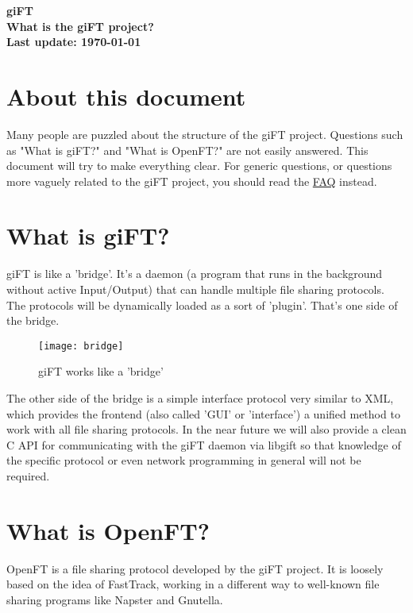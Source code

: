 \documentclass[10pt]{article}
\begin{document}
\begin{center}
\textsf{\textbf{\Huge{giFT}\\ \huge{What is the giFT project?}\\
\normalsize{Last update: \today}}}
\end{center}

\tableofcontents

\setlength{\parskip}{1.4ex}

\section{About this document}
Many people are puzzled about the structure of the giFT project. Questions
such as "What is giFT?" and "What is OpenFT?" are not easily answered. This
document will try to make everything clear. For generic questions, or questions
more vaguely related to the giFT project, you should read the
\href{http://gift.sourceforge.net/docs/?document=faq.html}{FAQ} instead.

\section{What is giFT?}
giFT is like a 'bridge'. It's a daemon (a program that runs in the background
without active Input/Output) that can handle multiple file sharing protocols.
The protocols will be dynamically loaded as a sort of 'plugin'.  That's one
side of the bridge.

\begin{figure}[bh]
  \begin{center}
    \texttt{[image: bridge]}
  \end{center}
  \caption{giFT works like a 'bridge'}
\end{figure}

The other side of the bridge is a simple interface protocol very similar to
XML, which provides the frontend (also called 'GUI' or 'interface') a unified
method to work with all file sharing protocols.  In the near future we will
also provide a clean C API for communicating with the giFT daemon via libgift
so that knowledge of the specific protocol or even network programming in
general will not be required.

\section{What is OpenFT?}
OpenFT is a file sharing protocol developed by the giFT project. It is loosely
based on the idea of FastTrack, working in a different way to well-known file
sharing programs like Napster and Gnutella.
\end{document}
